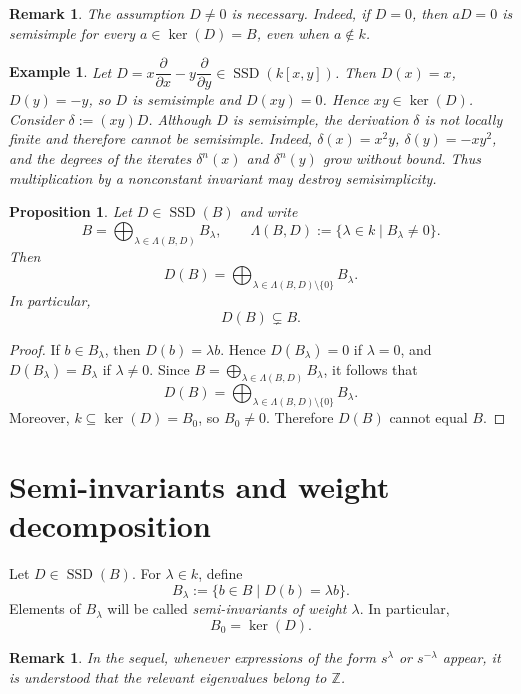 \documentclass[12pt]{amsart}
\newtheorem{proposition}[theorem]{Proposition}
\newtheorem{remark}[theorem]{Remark}
\newtheorem{example}[theorem]{Example}
\newcommand{\Z}{\mathbb Z}
\newcommand{\SSD}{\operatorname{SSD}}
\begin{document}
\begin{remark}
The assumption $D\neq 0$ is necessary. Indeed, if $D=0$, then $aD=0$ is semisimple for every
$a\in \ker(D)=B$, even when $a\notin k$.
\end{remark}

\begin{example}
Let $D=x\dfrac{\partial}{\partial x}-y\dfrac{\partial}{\partial y} \in \SSD(k[x,y])$.
Then $D(x)=x$, $D(y)=-y$, so $D$ is semisimple and $D(xy)=0$.
Hence $xy\in \ker(D)$.
Consider $\delta:=(xy)D$.
Although $D$ is semisimple, the derivation $\delta$ is not locally finite and therefore cannot be semisimple.
Indeed, $\delta(x)=x^2y$, $\delta(y)=-xy^2$, and the degrees of the iterates $\delta^n(x)$ and $\delta^n(y)$ grow without bound.
Thus multiplication by a nonconstant invariant may destroy semisimplicity.
\end{example}

\begin{proposition}
Let $D\in \SSD(B)$ and write
\[
B=\bigoplus_{\lambda\in \Lambda(B,D)} B_\lambda,
\qquad
\Lambda(B,D):=\{\lambda\in k\mid B_\lambda\neq 0\}.
\]
Then
\[
D(B)=\bigoplus_{\lambda\in \Lambda(B,D)\setminus\{0\}} B_\lambda.
\]
In particular,
\[
D(B)\subsetneq B.
\]
\end{proposition}

\begin{proof}
If $b\in B_\lambda$, then $D(b)=\lambda b$. Hence $D(B_\lambda)=0$ if $\lambda=0$,
and $D(B_\lambda)=B_\lambda$ if $\lambda\neq 0$.
Since $B=\bigoplus_{\lambda\in \Lambda(B,D)} B_\lambda$,
it follows that
\[
D(B)=\bigoplus_{\lambda\in \Lambda(B,D)\setminus\{0\}} B_\lambda.
\]
Moreover, $k\subseteq \ker(D)=B_0$, so $B_0\neq 0$. Therefore $D(B)$ cannot equal $B$.
\end{proof}

\section{Semi-invariants and weight decomposition}

Let $D\in \SSD(B)$. For $\lambda\in k$, define
\[
B_\lambda:=\{b\in B\mid D(b)=\lambda b\}.
\]
Elements of $B_\lambda$ will be called \emph{semi-invariants of weight $\lambda$}. In particular,
\[
B_0=\ker(D).
\]

\begin{remark}\label{rem:integer-exponents}
In the sequel, whenever expressions of the form $s^\lambda$ or $s^{-\lambda}$ appear, it is
understood that the relevant eigenvalues belong to $\Z$.
\end{remark}
\end{document}
